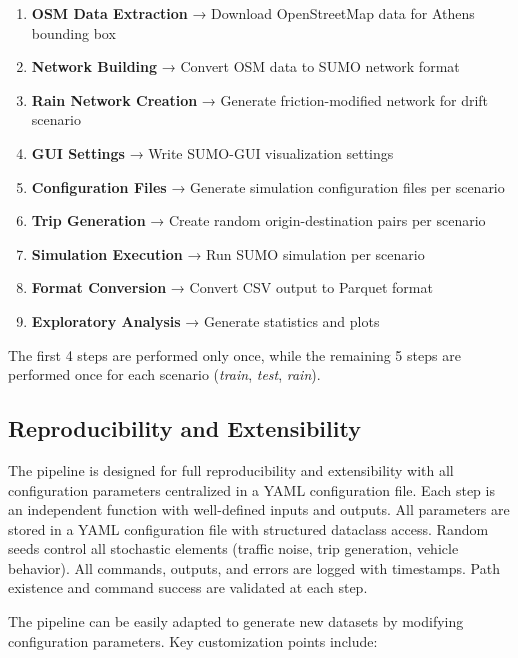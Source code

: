 \begin{enumerate}
    \item \textbf{OSM Data Extraction} → Download OpenStreetMap data for Athens bounding box
    \item \textbf{Network Building} → Convert OSM data to SUMO network format
    \item \textbf{Rain Network Creation} → Generate friction-modified network for drift scenario
    \item \textbf{GUI Settings} → Write SUMO-GUI visualization settings
    \item \textbf{Configuration Files} → Generate simulation configuration files per scenario
    \item \textbf{Trip Generation} → Create random origin-destination pairs per scenario
    \item \textbf{Simulation Execution} → Run SUMO simulation per scenario
    \item \textbf{Format Conversion} → Convert CSV output to Parquet format
    \item \textbf{Exploratory Analysis} → Generate statistics and plots
\end{enumerate}

The first 4 steps are performed only once, while the remaining 5 steps are performed once for each scenario (\emph{train}, \emph{test}, \emph{rain}).

\subsection{Reproducibility and Extensibility}
The pipeline is designed for full reproducibility and extensibility with all configuration parameters centralized in a YAML configuration file.
Each step is an independent function with well-defined inputs and outputs.
All parameters are stored in a YAML configuration file with structured dataclass access.
Random seeds control all stochastic elements (traffic noise, trip generation, vehicle behavior).
All commands, outputs, and errors are logged with timestamps.
Path existence and command success are validated at each step.

The pipeline can be easily adapted to generate new datasets by modifying configuration parameters.
Key customization points include:

